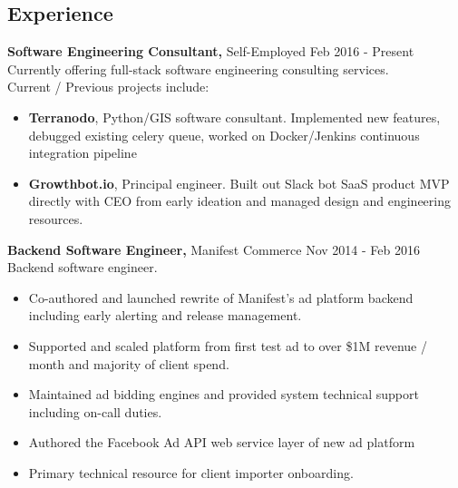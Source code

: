 \documentclass[margin]{res}
\begin{document}
 
 
\address{{\bf Current Location} \\ Encinitas, CA 92024}
\address{{\bf Contact Information} \\ Mobile: \space \space (724) VAN-VEEN \\Email: \space \space \space michael@mvanveen.net\\Website: \space mvv.io\\
Github: \space \space github.com/mvanveen} 
\begin{resume} 
 
\section{Experience}

  {\bf Software Engineering Consultant,} Self-Employed   \hfill Feb 2016 - Present \\
    Currently offering full-stack software engineering consulting services. \\
    Current / Previous projects include:
    \begin{itemize}
    \item {\bf Terranodo}, Python/GIS software consultant.  Implemented new features, debugged 
    existing celery queue, worked on Docker/Jenkins continuous integration pipeline 
    \item {\bf Growthbot.io}, Principal engineer.  Built out Slack bot SaaS product MVP 
    directly with CEO from early ideation and managed design and engineering resources.
    \end{itemize}

  {\bf Backend Software Engineer,} Manifest Commerce \hfill Nov 2014 - Feb 2016\\
  Backend software engineer.
  \begin{itemize}
    \item Co-authored and launched rewrite of Manifest's ad platform backend including early alerting and release management.
    \item Supported and scaled platform from first test ad to over \$1M revenue / month and majority of client spend.
    \item Maintained ad bidding engines and provided system technical support including on-call duties.
    \item Authored the Facebook Ad API web service layer of new ad platform
    \item Primary technical resource for client importer onboarding.
  \end{itemize}


\end{resume}
\end{document}
